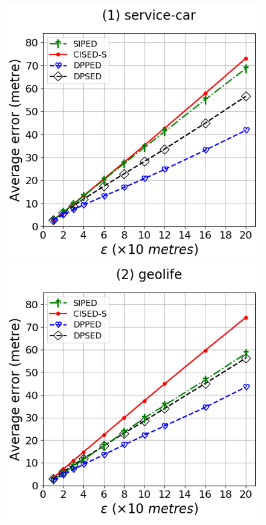 {\begin{figure}[tb]
	\centering
	\includegraphics[scale = 0.2900]{Figures/Exp-error-epsilon-ped-service.png}\hspace{1ex}
	\includegraphics[scale = 0.2900]{Figures/Exp-error-epsilon-ped-geolife.png}\hspace{1ex}

\end{figure}}
